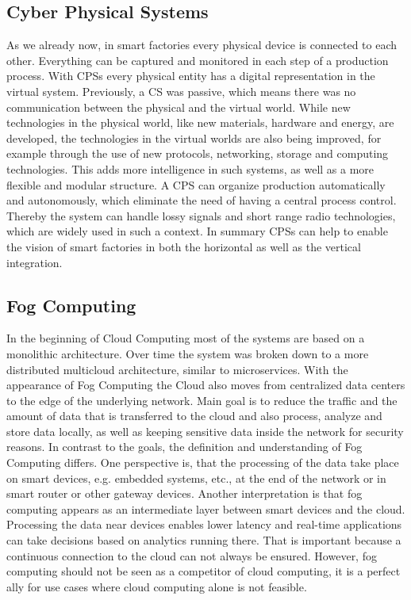 \subsection{Cyber Physical Systems}
As we already now, in smart factories every physical device is connected to each other.
Everything can be captured and monitored in each step of a production process.
With \acp{CPS} every physical entity has a digital representation in the virtual system.\autocite[cf.][p. 1363]{Poovendran:2010}
Previously, a \ac{CS} was passive, which means there was no communication between the physical and the virtual world.\autocite[cf.][p. 1364]{Poovendran:2010}
While new technologies in the physical world, like new materials, hardware and energy, are developed, the technologies in the virtual worlds are also being improved, for example through the use of new protocols, networking, storage and computing technologies.\autocite[cf.][p. 1364]{Poovendran:2010}
This adds more intelligence in such systems, as well as a more flexible and modular structure.
A \ac{CPS} can organize production automatically and autonomously, which eliminate the need of having a central process control.\autocite[cf.]{Lom:2016}
Thereby the system can handle lossy signals and short range radio technologies, which are widely used in such a context.\autocite[cf.]{Yannuzzi:2014}
In summary \acp{CPS} can help to enable the vision of smart factories in both the horizontal as well as the vertical integration.


\subsection{Fog Computing}
In the beginning of Cloud Computing most of the systems are based on a monolithic architecture.
Over time the system was broken down to a more distributed multicloud architecture, similar to microservices.
With the appearance of Fog Computing the Cloud also moves from centralized data centers to the edge of the underlying network.
Main goal is to reduce the traffic and the amount of data that is transferred to the cloud and also process, analyze and store data locally, as well as keeping sensitive data inside the network for security reasons.\autocite[cf.][p. 236]{Brito:2016}\autocite[cf.][p. 325]{Yannuzzi:2014}\autocite[cf.][p. 4]{Lom:2016}
In contrast to the goals, the definition and understanding of Fog Computing differs.
One perspective is, that the processing of the data take place on smart devices, e.g. embedded systems, etc., at the end of the network or in smart router or other gateway devices.\autocite[cf.][p. 4]{Lom:2016}
Another interpretation is that fog computing appears as an intermediate layer between smart devices and the cloud.\autocite[cf.][p. 236]{Brito:2016}
Processing the data near devices enables lower latency and real-time applications can take decisions based on analytics running there.
That is important because a continuous connection to the cloud can not always be ensured.
However, fog computing should not be seen as a competitor of cloud computing, it is a perfect ally for use cases where cloud computing alone is not feasible.\autocite[cf.][p. 325]{Yannuzzi:2014}


